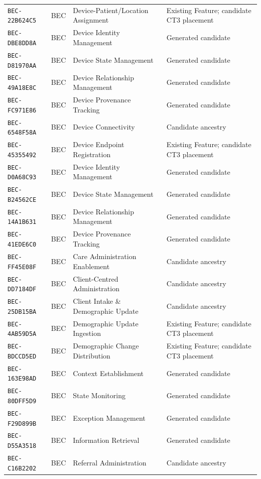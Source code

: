 \documentclass[11pt,a4paper,openany]{book}
\begin{document}
\begin{longtable}{@{}p{.19\linewidth}p{.12\linewidth}p{.39\linewidth}p{.24\linewidth}@{}}
\texttt{BEC-22B624C5} & BEC & Device-Patient/Location Assignment & Existing Feature; candidate CT3 placement \\
\texttt{BEC-DBE8DD8A} & BEC & Device Identity Management & Generated candidate \\
\texttt{BEC-D81970AA} & BEC & Device State Management & Generated candidate \\
\texttt{BEC-49A18E8C} & BEC & Device Relationship Management & Generated candidate \\
\texttt{BEC-FC971E86} & BEC & Device Provenance Tracking & Generated candidate \\
\texttt{BEC-6548F58A} & BEC & Device Connectivity & Candidate ancestry \\
\texttt{BEC-45355492} & BEC & Device Endpoint Registration & Existing Feature; candidate CT3 placement \\
\texttt{BEC-D0A68C93} & BEC & Device Identity Management & Generated candidate \\
\texttt{BEC-B24562CE} & BEC & Device State Management & Generated candidate \\
\texttt{BEC-14A1B631} & BEC & Device Relationship Management & Generated candidate \\
\texttt{BEC-41EDE6C0} & BEC & Device Provenance Tracking & Generated candidate \\
\texttt{BEC-FF45E08F} & BEC & Care Administration Enablement & Candidate ancestry \\
\texttt{BEC-DD7184DF} & BEC & Client-Centred Administration & Candidate ancestry \\
\texttt{BEC-25DB15BA} & BEC & Client Intake \& Demographic Update & Candidate ancestry \\
\texttt{BEC-4AB59D5A} & BEC & Demographic Update Ingestion & Existing Feature; candidate CT3 placement \\
\texttt{BEC-BDCCD5ED} & BEC & Demographic Change Distribution & Existing Feature; candidate CT3 placement \\
\texttt{BEC-163E98AD} & BEC & Context Establishment & Generated candidate \\
\texttt{BEC-80DFF5D9} & BEC & State Monitoring & Generated candidate \\
\texttt{BEC-F29D899B} & BEC & Exception Management & Generated candidate \\
\texttt{BEC-D55A3518} & BEC & Information Retrieval & Generated candidate \\
\texttt{BEC-C16B2202} & BEC & Referral Administration & Candidate ancestry \\

\end{longtable}
\end{document}
